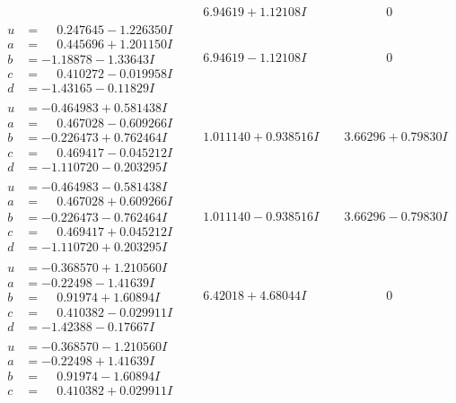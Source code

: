 \documentclass[1p]{elsarticle_modified}
\theoremstyle{definition}
\begin{document}
$$\begin{array}{c|c|c}
 & \phantom{-}6.94619 + 1.12108 I & \phantom{-0.000000 } 0 \\ \hline\begin{aligned}
u &= \phantom{-}0.247645 - 1.226350 I \\
a &= \phantom{-}0.445696 + 1.201150 I \\
b &= -1.18878 - 1.33643 I \\
c &= \phantom{-}0.410272 - 0.019958 I \\
d &= -1.43165 - 0.11829 I\end{aligned}
 & \phantom{-}6.94619 - 1.12108 I & \phantom{-0.000000 } 0 \\ \hline\begin{aligned}
u &= -0.464983 + 0.581438 I \\
a &= \phantom{-}0.467028 - 0.609266 I \\
b &= -0.226473 + 0.762464 I \\
c &= \phantom{-}0.469417 - 0.045212 I \\
d &= -1.110720 - 0.203295 I\end{aligned}
 & \phantom{-}1.011140 + 0.938516 I & \phantom{-}3.66296 + 0.79830 I \\ \hline\begin{aligned}
u &= -0.464983 - 0.581438 I \\
a &= \phantom{-}0.467028 + 0.609266 I \\
b &= -0.226473 - 0.762464 I \\
c &= \phantom{-}0.469417 + 0.045212 I \\
d &= -1.110720 + 0.203295 I\end{aligned}
 & \phantom{-}1.011140 - 0.938516 I & \phantom{-}3.66296 - 0.79830 I \\ \hline\begin{aligned}
u &= -0.368570 + 1.210560 I \\
a &= -0.22498 - 1.41639 I \\
b &= \phantom{-}0.91974 + 1.60894 I \\
c &= \phantom{-}0.410382 - 0.029911 I \\
d &= -1.42388 - 0.17667 I\end{aligned}
 & \phantom{-}6.42018 + 4.68044 I & \phantom{-0.000000 } 0 \\ \hline\begin{aligned}
u &= -0.368570 - 1.210560 I \\
a &= -0.22498 + 1.41639 I \\
b &= \phantom{-}0.91974 - 1.60894 I \\
c &= \phantom{-}0.410382 + 0.029911 I \\

\end{aligned}
\end{array}$$
\end{document}
